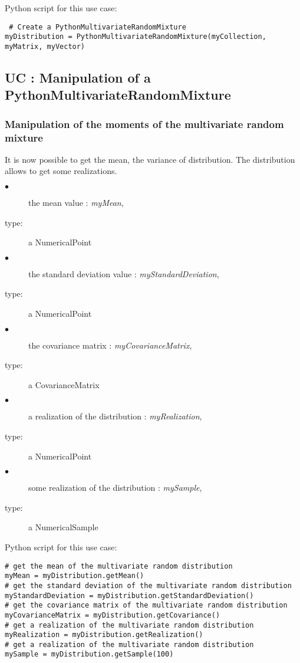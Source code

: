Python script for this use case:

\begin{lstlisting}
 # Create a PythonMultivariateRandomMixture
myDistribution = PythonMultivariateRandomMixture(myCollection, myMatrix, myVector)
\end{lstlisting}

\subsection{UC : Manipulation of a PythonMultivariateRandomMixture}

\subsubsection{Manipulation of the moments of the multivariate random mixture}
It is now possible to get the mean, the variance of distribution.
The distribution allows to get some realizations.\\
{
  \begin{description}
  \item[$\bullet$] the mean value : {\itshape myMean},
  \item[type:] a NumericalPoint
  \item[$\bullet$] the standard deviation value : {\itshape myStandardDeviation},
  \item[type:] a NumericalPoint
  \item[$\bullet$] the covariance matrix : {\itshape myCovarianceMatrix},
  \item[type:] a CovarianceMatrix
  \item[$\bullet$] a realization of the distribution : {\itshape myRealization},
  \item[type:] a NumericalPoint
  \item[$\bullet$] some realization of the distribution : {\itshape mySample},
  \item[type:] a NumericalSample
  \end{description}
}
\espace

Python script for this use case:

\begin{lstlisting}
# get the mean of the multivariate random distribution
myMean = myDistribution.getMean()
# get the standard deviation of the multivariate random distribution
myStandardDeviation = myDistribution.getStandardDeviation()
# get the covariance matrix of the multivariate random distribution
myCovarianceMatrix = myDistribution.getCovariance()
# get a realization of the multivariate random distribution
myRealization = myDistribution.getRealization()
# get a realization of the multivariate random distribution
mySample = myDistribution.getSample(100)
\end{lstlisting}

